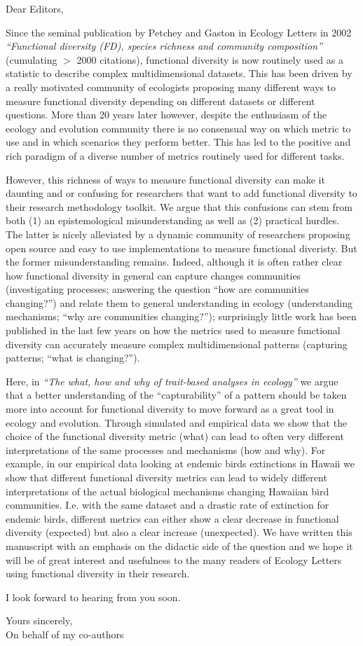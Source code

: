 \documentclass[11pt]{letter}
\begin{document}
\begin{letter}{}
\opening{Dear Editors,}

Since the seminal publication by Petchey and Gaston in Ecology Letters in 2002 \textit{``Functional diversity (FD), species richness and community composition''} (cumulating $>$ 2000 citations), functional diversity is now routinely used as a statistic to describe complex multidimensional datasets.
This has been driven by a really motivated community of ecologists proposing many different ways to measure functional diversity depending on different datasets or different questions.
More than 20 years later however, despite the enthusiasm of the ecology and evolution community there is no consensual way on which metric to use and in which scenarios they perform better.
This has led to the positive and rich paradigm of a diverse number of metrics routinely used for different tasks.

However, this richness of ways to measure functional diversity can make it daunting and or confusing for researchers that want to add functional diversity to their research methodology toolkit.
We argue that this confusions can stem from both (1) an epistemological misunderstanding as well as (2) practical hurdles.
The latter is nicely alleviated by a dynamic community of researchers proposing open source and easy to use implementations to measure functional diveristy.
But the former misunderstanding remains.
Indeed, although it is often rather clear how functional diversity in general can capture changes communities (investigating processes; answering the question ``how are communities changing?'') and relate them to general understanding in ecology (understanding mechanisms; ``why are communities changing?''); surprisingly little work has been published in the last few years on how the metrics used to measure functional diversity can accurately measure complex multidimensional patterns (capturing patterns; ``what is changing?'').

Here, in \textit{``The what, how and why of trait-based analyses in ecology''} we argue that a better understanding of the ``capturability'' of a pattern should be taken more into account for functional diversity to move forward as a great tool in ecology and evolution.
Through simulated and empirical data we show that the choice of the functional diversity metric (what) can lead to often very different interpretations of the same processes and mechanisms (how and why).
For example, in our empirical data looking at endemic birds extinctions in Hawaii we show that different functional diversity metrics can lead to widely different interpretations of the actual biological mechanisms changing Hawaiian bird communities.
I.e. with the same dataset and a drastic rate of extinction for endemic birds, different metrics can either show a clear decrease in functional diversity (expected) but also a clear increase (unexpected).
We have written this manuscript with an emphasis on the didactic side of the question and we hope it will be of great interest and usefulness to the many readers of Ecology Letters using functional diversity in their research.

I look forward to hearing from you soon.

\closing{Yours sincerely,\\On behalf of my co-authors}

\end{letter}
\end{document}
